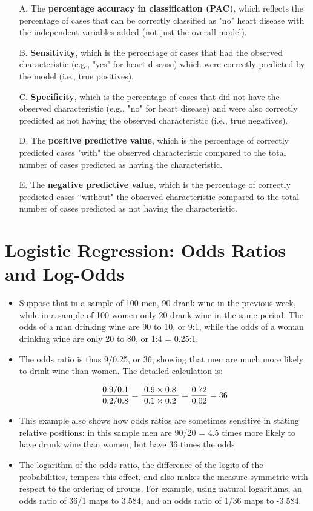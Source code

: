 \documentclass[12pt]{article}
\begin{document}
\begin{itemize}
\item[A.] The \textbf{percentage accuracy in classification (PAC)}, which reflects the percentage of cases that can be correctly classified as "no" heart disease with the independent variables added (not just the overall model).
\item[B.] \textbf{Sensitivity}, which is the percentage of cases that had the observed characteristic (e.g., "yes" for heart disease) which were correctly predicted by the model (i.e., true positives).
\item[C.] \textbf{Specificity}, which is the percentage of cases that did not have the observed characteristic (e.g., "no" for heart disease) and were also correctly predicted as not having the observed characteristic (i.e., true negatives).
\item[D.] The \textbf{positive predictive value}, which is the percentage of correctly predicted cases "with" the observed characteristic compared to the total number of cases predicted as having the characteristic.
\item[E.] The \textbf{negative predictive value}, which is the percentage of correctly predicted cases ``without" the observed characteristic compared to the total number of cases predicted as not having the characteristic.
\end{itemize}
\newpage

\section{Logistic Regression: Odds Ratios and Log-Odds}
\begin{itemize}
	\item Suppose that in a sample of 100 men, 90 drank wine in the previous week, while in a sample of 100 women only 20 drank wine in the same period. The odds of a man drinking wine are 90 to 10, or 9:1, while the odds of a woman drinking wine are only 20 to 80, or 1:4 = 0.25:1. 
	\item The odds ratio is thus 9/0.25, or 36, showing that men are much more likely to drink wine than women. The detailed calculation is:
	
	\[ { 0.9/0.1 \over 0.2/0.8}=\frac{\;0.9\times 0.8\;}{\;0.1\times 0.2\;} ={0.72 \over 0.02} = 36 \]
	
	\item This example also shows how odds ratios are sometimes sensitive in stating relative positions: in this sample men are 90/20 = 4.5 times more likely to have drunk wine than women, but have 36 times the odds. 
	
	
	\item The logarithm of the odds ratio, the difference of the logits of the probabilities, tempers this effect, and also makes the measure symmetric with respect to the ordering of groups. For example, using natural logarithms, an odds ratio of 36/1 maps to 3.584, and an odds ratio of 1/36 maps to -3.584.
\end{itemize}
\end{document}
